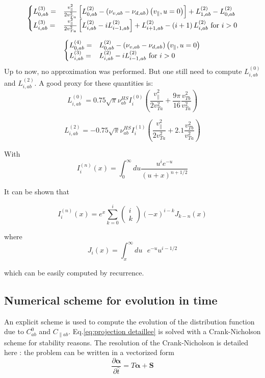 \documentclass[11pt,preprint]{elsarticle}
\begin{document}
\[
\begin{cases}
L_{0,ab}^{(3)}= & \frac{v_{\parallel}^{2}}{2v_{Ta}^{2}}\left[L_{0,ab}^{(2)}-\left(\nu_{v,ab}-\nu_{d,ab}\right)\left(v_{\parallel},u=0\right)\right]+L_{1,ab}^{(2)}-L_{0,ab}^{(2)}\\
L_{i,ab}^{(3)}= & \frac{v_{\parallel}^{2}}{2v_{Ta}^{2}}\left[L_{i,ab}^{(2)}-iL_{i-1,ab}^{(2)}\right]+L_{i+1,ab}^{(2)}-\left(i+1\right)L_{i,ab}^{(2)}\text{ for \ensuremath{i>0}}
\end{cases}
\]


\[
\begin{cases}
L_{0,ab}^{(4)}= & L_{0,ab}^{(2)}-\left(\nu_{v,ab}-\nu_{d,ab}\right)\left(v_{\parallel},u=0\right)\\
L_{i,ab}^{(3)}= & L_{i,ab}^{(2)}-iL_{i-1,ab}^{(2)}\text{ for \ensuremath{i>0}}
\end{cases}
\]
Up to now, no approximation was performed. But one still need to compute $L_{i,ab}^{(0)}$  and $L_{i,ab}^{(2)}$. A good proxy for these quantities is:
\[
L_{i,ab}^{(0)}=0.75\sqrt{\pi}\nu_{ab}^{HS}I_{i}^{(0)}\left(\frac{v_{\parallel}^{2}}{2v_{Ta}^{2}}+\frac{9\pi}{16}\frac{v_{Tb}^{2}}{v_{Ta}^{2}}\right)
\]


\[
L_{i,ab}^{(2)}=-0.75\sqrt{\pi}\nu_{ab}^{HS}I_{i}^{(1)}\left(\frac{v_{\parallel}^{2}}{2v_{Ta}^{2}}+2.1\frac{v_{Tb}^{2}}{v_{Ta}^{2}}\right)
\]


With 
\[
I_{i}^{(n)}\left(x\right)=\int_{0}^{\infty}du\frac{u^{i}e^{-u}}{\left(u+x\right)^{n+1/2}}
\]


It can be shown that

\[
I_{i}^{(n)}\left(x\right)=e^{x}\sum_{k=0}^{i}\left(\begin{array}{c}
i\\
k
\end{array}\right)\left(-x\right)^{i-k}J_{k-n}\left(x\right)
\]


where
\[
J_{i}\left(x\right)=\int_{x}^{\infty}du\text{ }e^{-u}u^{i-1/2}
\]


which can be easily computed by recurrence. 


\subsection{Numerical scheme for evolution in time}

An explicit scheme is used to compute the evolution of the distribution
function due to $C_{ab}^{0}$ and $C_{\parallel ab}$. Eq.\eqref{eq:projection detaillee} is solved with a Crank-Nicholson scheme for stability reasons. The resolution of the Crank-Nicholson is detailed
here : the problem can be written in a vectorized form
\[
\frac{\partial\boldsymbol{\alpha}}{\partial\hat{t}}=T\boldsymbol{\alpha}+\boldsymbol{S}
\]
\end{document}
